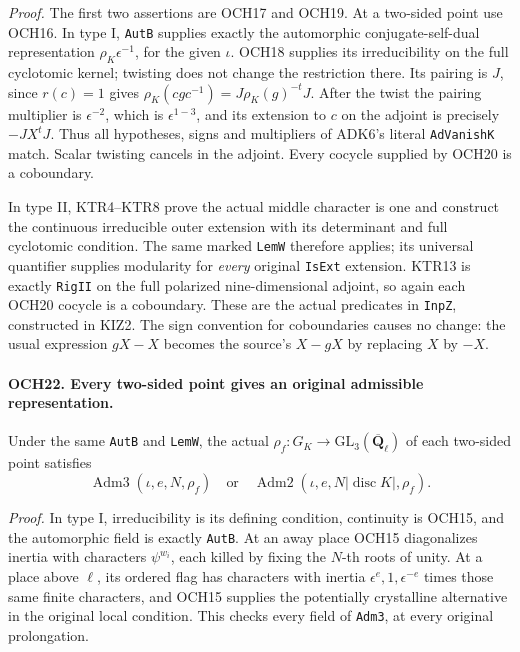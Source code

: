 \emph{Proof.}
The first two assertions are OCH17 and OCH19.  At a two-sided
point use OCH16.  In type I, \texttt{AutB} supplies exactly the
automorphic conjugate-self-dual representation
\(\rho_K\epsilon^{-1}\), for the given \(\iota\).
OCH18 supplies its irreducibility on the full cyclotomic kernel;
twisting does not change the restriction there.  Its pairing is
\(J\), since \(r(c)=1\) gives
\(\rho_K(cgc^{-1})=J\rho_K(g)^{-t}J\).
After the twist the pairing multiplier is \(\epsilon^{-2}\),
which is \(\epsilon^{1-3}\), and its extension to \(c\)
on the adjoint is precisely \(-JX^tJ\).
Thus all hypotheses, signs and multipliers of ADK6's literal
\texttt{AdVanishK} match.  Scalar twisting cancels in the
adjoint.  Every cocycle supplied by OCH20 is a coboundary.

In type II, KTR4--KTR8 prove the actual middle character is one
and construct the continuous irreducible outer extension with
its determinant and full cyclotomic condition.  The same marked
\texttt{LemW} therefore applies; its universal quantifier supplies
modularity for \emph{every} original \texttt{IsExt} extension.
KTR13 is exactly \texttt{RigII} on the full polarized
nine-dimensional adjoint, so again each OCH20 cocycle is a
coboundary.  These are the actual predicates in \texttt{InpZ},
constructed in KIZ2.  The sign convention for coboundaries causes
no change: the usual expression \(gX-X\) becomes the source's
\(X-gX\) by replacing \(X\) by \(-X\).

\paragraph{OCH22. Every two-sided point gives an original admissible representation.}
\label{claim:OCH22}
Under the same \texttt{AutB} and \texttt{LemW}, the actual
\(\rho_f:G_K\to\mathrm{GL}_3(\overline{\mathbf Q}_\ell)\)
of each two-sided point satisfies
\[
       \operatorname{Adm3}(\iota,e,N,\rho_f)
       \quad\text{or}\quad
       \operatorname{Adm2}(\iota,e,N|\operatorname{disc}K|,\rho_f).
 \tag{OCH.13}
\]

\emph{Proof.}
In type I, irreducibility is its defining condition, continuity
is OCH15, and the automorphic field is exactly \texttt{AutB}.
At an away place OCH15 diagonalizes inertia with characters
\(\psi^{w_i}\), each killed by fixing the \(N\)-th roots
of unity.  At a place above \(\ell\), its ordered flag has
characters with inertia
\(\epsilon^{e},1,\epsilon^{-e}\) times those same finite
characters, and OCH15 supplies the potentially crystalline
alternative in the original local condition.  This checks every
field of \texttt{Adm3}, at every original prolongation.

